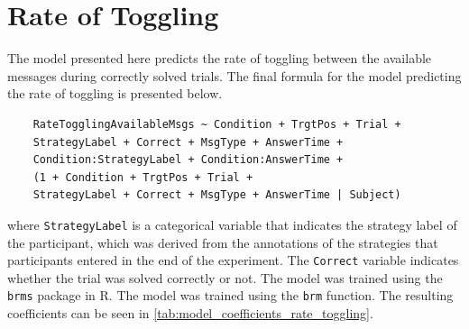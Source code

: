 \section{Rate of Toggling}
\label{sec:rate_toggling}

The model presented here predicts the rate of toggling between the available messages during correctly solved trials. The final formula for the model predicting the rate of toggling is presented below.

\begin{verbatim}
    RateTogglingAvailableMsgs ~ Condition + TrgtPos + Trial +
    StrategyLabel + Correct + MsgType + AnswerTime +
    Condition:StrategyLabel + Condition:AnswerTime +
    (1 + Condition + TrgtPos + Trial +
    StrategyLabel + Correct + MsgType + AnswerTime | Subject)
\end{verbatim}

where \texttt{StrategyLabel} is a categorical variable that indicates the strategy label of the participant, which was derived from the annotations of the strategies that participants entered in the end of the experiment. The \texttt{Correct} variable indicates whether the trial was solved correctly or not. The model was trained using the \texttt{brms} package in R. The model was trained using the \texttt{brm} function. The resulting coefficients can be seen in \autoref{tab:model_coefficients_rate_toggling}.



